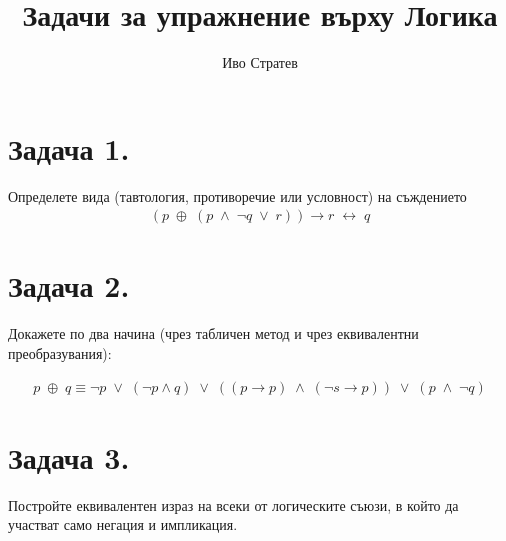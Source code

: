\documentclass[12pt]{article}
\title{Задачи за упражнение върху Логика}
\author{Иво Стратев}
\begin{document}
\maketitle

\section*{Задача 1.}

Определете вида (тавтология, противоречие или условност) на съждението
\begin{align*}
(p \; \oplus \; (p \; \land \; \neg q \; \lor \;  r)) \to r \; \leftrightarrow \; q
\end{align*}

\section*{Задача 2.}
Докажете по два начина (чрез табличен метод и чрез еквивалентни преобразувания):

\begin{align*}
p \; \oplus \; q \equiv \neg p \; \lor \; (\neg p \land q) \; \lor \; ((p \to p) \; \land \; (\neg s \to p)) \; \lor \; (p \; \land \; \neg q)
\end{align*}

\section*{Задача 3.}

Постройте еквивалентен израз на всеки от логическите съюзи, в който да участват само негация и импликация.
\end{document}
